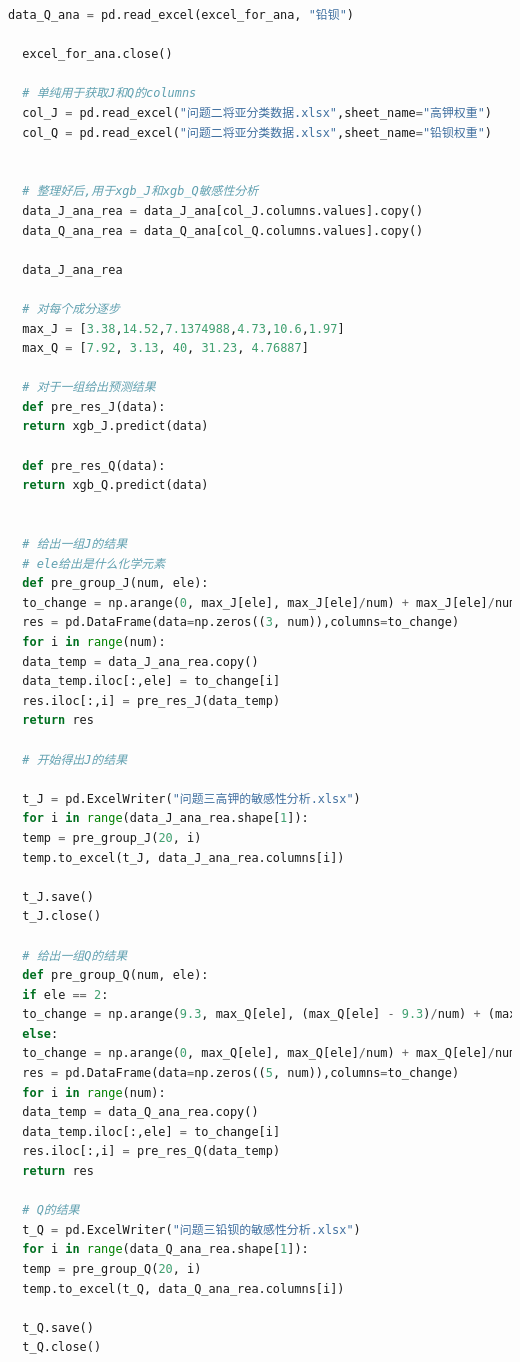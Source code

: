 \documentclass[withoutpreface,bwprint]{cumcmthesis} %
\begin{document}
\begin{appendices}
\begin{lstlisting}[language=python]
  data_Q_ana = pd.read_excel(excel_for_ana, "铅钡")
  
  excel_for_ana.close()
  
  # 单纯用于获取J和Q的columns
  col_J = pd.read_excel("问题二将亚分类数据.xlsx",sheet_name="高钾权重")
  col_Q = pd.read_excel("问题二将亚分类数据.xlsx",sheet_name="铅钡权重")
  
  
  # 整理好后,用于xgb_J和xgb_Q敏感性分析
  data_J_ana_rea = data_J_ana[col_J.columns.values].copy()
  data_Q_ana_rea = data_Q_ana[col_Q.columns.values].copy()
  
  data_J_ana_rea
  
  # 对每个成分逐步
  max_J = [3.38,14.52,7.1374988,4.73,10.6,1.97]
  max_Q = [7.92, 3.13, 40, 31.23, 4.76887]
  
  # 对于一组给出预测结果
  def pre_res_J(data):
  return xgb_J.predict(data)
  
  def pre_res_Q(data):
  return xgb_Q.predict(data)
  
  
  # 给出一组J的结果
  # ele给出是什么化学元素
  def pre_group_J(num, ele): 
  to_change = np.arange(0, max_J[ele], max_J[ele]/num) + max_J[ele]/num
  res = pd.DataFrame(data=np.zeros((3, num)),columns=to_change)
  for i in range(num):
  data_temp = data_J_ana_rea.copy()
  data_temp.iloc[:,ele] = to_change[i]
  res.iloc[:,i] = pre_res_J(data_temp)
  return res
  
  # 开始得出J的结果
  
  t_J = pd.ExcelWriter("问题三高钾的敏感性分析.xlsx")
  for i in range(data_J_ana_rea.shape[1]):
  temp = pre_group_J(20, i)
  temp.to_excel(t_J, data_J_ana_rea.columns[i])
  
  t_J.save()
  t_J.close()
  
  # 给出一组Q的结果
  def pre_group_Q(num, ele):
  if ele == 2:
  to_change = np.arange(9.3, max_Q[ele], (max_Q[ele] - 9.3)/num) + (max_Q[ele] - 9.3)/num
  else:
  to_change = np.arange(0, max_Q[ele], max_Q[ele]/num) + max_Q[ele]/num
  res = pd.DataFrame(data=np.zeros((5, num)),columns=to_change)
  for i in range(num):
  data_temp = data_Q_ana_rea.copy()
  data_temp.iloc[:,ele] = to_change[i]
  res.iloc[:,i] = pre_res_Q(data_temp)
  return res
  
  # Q的结果
  t_Q = pd.ExcelWriter("问题三铅钡的敏感性分析.xlsx")
  for i in range(data_Q_ana_rea.shape[1]):
  temp = pre_group_Q(20, i)
  temp.to_excel(t_Q, data_Q_ana_rea.columns[i])
  
  t_Q.save()
  t_Q.close()
  
 
\end{lstlisting}



\end{appendices}
\end{document}
